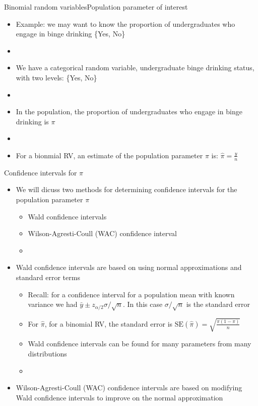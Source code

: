 \documentclass[xcolor=dvipsnames]{beamer}
\begin{document}
\begin{frame}{Binomial random variables}{Population parameter of interest}
	\begin{itemize}
		\item Example: we may want to know the proportion of undergraduates who engage in binge drinking \{Yes, No\}
		\item[]
		\item We have a categorical random variable, undergraduate binge drinking status, with two levels: \{Yes, No\} 
		\item[]
		\item In the population, the proportion of undergraduates who engage in binge drinking is $\pi$
		\item[]
		\item For a bionmial RV, an estimate of the population parameter $\pi$ is: $\hat{\pi} = \frac{y}{n}$
	\end{itemize}
\end{frame}

\begin{frame}{Confidence intervals for $\pi$}
	\begin{itemize}
		\item We will dicuss two methods for determining confidence intervals for the population parameter $\pi$
		\begin{itemize}
			\item Wald confidence intervals
			\item Wilson-Agresti-Coull (WAC) confidence interval
			\item[]
		\end{itemize}
		
		\item Wald confidence intervals are based on using normal approximations and standard error terms
		\begin{itemize}
			\item Recall: for a confidence interval for a population mean with known variance we had $\bar{y} \pm z_{\alpha / 2} \sigma / \sqrt{n}$. In this case $\sigma / \sqrt{n}$ is the standard error
			\item For $\hat{\pi}$, for a binomial RV, the standard error is $\text{SE}(\hat{\pi}) = \sqrt{\frac{\pi(1-\pi)}{n}}$
			\item Wald confidence intervals can be found for many parameters from many distributions
			\item[]
		\end{itemize}
	
		\item Wilson-Agresti-Coull (WAC) confidence intervals are based on modifying Wald confidence intervals to improve on the normal approximation
	\end{itemize}
\end{frame}
\end{document}
